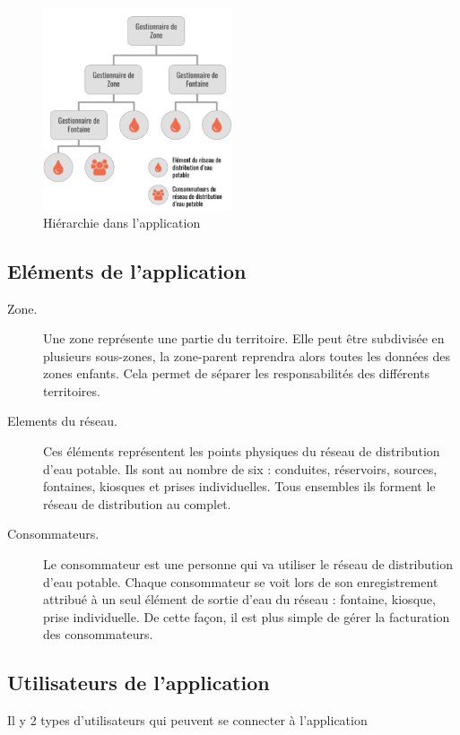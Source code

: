 \documentclass{EPL-master-thesis-covers-FR}
\begin{document}
				\begin{figure}[H]
					\centering
					\includegraphics[width=0.5\textwidth]{images/hierarchie}
					\caption{Hiérarchie dans l'application}
				\end{figure}
				
				
			\subsection{Eléments de l'application}
				\begin{description}
					\item[Zone.] Une zone représente une partie du territoire. Elle peut être subdivisée en plusieurs sous-zones, la zone-parent reprendra alors toutes les données des zones enfants. Cela permet de séparer les responsabilités des différents territoires.
					\item[Elements du réseau.] Ces éléments représentent les points physiques du réseau de distribution d'eau potable. Ils sont au nombre de six : conduites, réservoirs, sources, fontaines, kiosques et prises individuelles. Tous ensembles ils forment le réseau de distribution au complet. 
					\item[Consommateurs.] Le consommateur est une personne qui va utiliser le réseau de distribution d'eau potable. Chaque consommateur se voit lors de son enregistrement attribué à un seul élément de sortie d'eau du réseau : fontaine, kiosque, prise individuelle. De cette façon, il est plus simple de gérer la facturation des consommateurs.
				\end{description}
				
			
				
				
			\subsection{Utilisateurs de l'application}
				Il y 2 types d'utilisateurs qui peuvent se connecter à l'application
				
\end{document}

